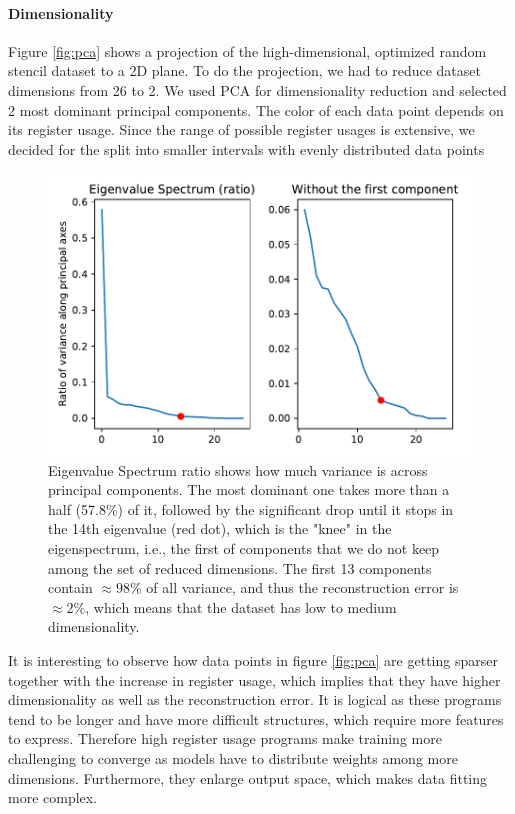 \documentclass[sigplan,\review anonymous]{acmart}
\begin{document}
\paragraph{Dimensionality} Figure \ref{fig:pca} shows a projection of the
high-dimensional, optimized random stencil dataset to a 2D plane. To do the
projection, we had to reduce dataset dimensions from 26 to 2. We used PCA for
dimensionality reduction and selected 2 most dominant principal components.
The color of each data point depends on its register usage. Since the range
of possible register usages is extensive, we decided for the split into smaller
intervals with evenly distributed data points

\begin{figure}
  \centering
  \includegraphics[width=0.9\columnwidth]{images/eigenvalues.pdf}
  \caption{ Eigenvalue Spectrum ratio shows how much variance is across
  principal components. The most dominant one takes more than a half (57.8\%)
  of it, followed by the significant drop until it stops in the 14th
  eigenvalue (red dot), which is the "knee" in the eigenspectrum, i.e.,
  the first of components that we do not keep among the set of reduced
  dimensions. The first 13 components contain $\approx 98\%$ of all variance,
  and thus the reconstruction error is $\approx 2\%$, which means that the
  dataset has low to medium dimensionality. }
  \label{fig:eigenvalues}
\end{figure}

It is interesting to observe how data points in figure \ref{fig:pca} are
getting sparser together with the increase in register usage, which implies
that they have higher dimensionality as well as the reconstruction error.
It is logical as these programs tend to be longer and have more difficult
structures, which require more features to express. Therefore high register
usage programs make training more challenging to converge as models have to
distribute weights among more dimensions. Furthermore, they enlarge output
space, which makes data fitting more complex.
\end{document}
